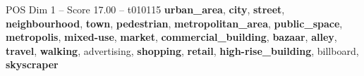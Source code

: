 \begin{textsample}{POS Dim 1 – Score 17.00 – t010115}  \label{ex:f1_pos_037}
\textbf{urban\_area}, \textbf{city}, \textbf{street}, \textbf{neighbourhood}, \textbf{town}, \textbf{pedestrian}, \textbf{metropolitan\_area}, \textbf{public\_space}, \textbf{metropolis}, \textbf{mixed-use}, \textbf{market}, \textbf{commercial\_building}, \textbf{bazaar}, \textbf{alley}, \textbf{travel}, \textbf{walking}, advertising, \textbf{shopping}, \textbf{retail}, \textbf{high-rise\_building}, billboard, \textbf{skyscraper}

\end{textsample}
